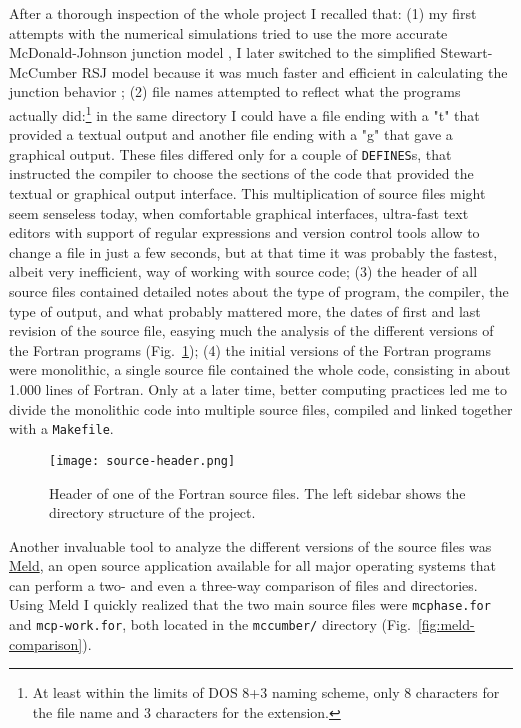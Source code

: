 After a thorough inspection of the whole project I recalled that:
(1) my first attempts with the numerical simulations tried to use the more accurate McDonald-Johnson junction model \cite{McDonald:1976}, I later switched to the simplified Stewart-McCumber RSJ model because it was much faster and efficient in calculating the junction behavior \cite{McCumber:1968, Stewart:1974};
(2) file names attempted to reflect what the programs actually did:\footnote{At least within the limits of DOS 8+3 naming scheme, only 8 characters for the file name and 3 characters for the extension.} 
in the same directory I could have a file ending with a "t" that provided a textual output and another file ending with a "g" that gave a graphical output.
These files differed only for a couple of \texttt{DEFINES}s, that instructed the compiler to choose the sections of the code that provided the textual or graphical output interface.
This multiplication of source files might seem senseless today, when comfortable graphical interfaces, ultra-fast text editors with support of regular expressions and version control tools allow to change a file in just a few seconds, but at that time it was probably the fastest, albeit very inefficient, way of working with source code;
(3) the header of all source files contained detailed notes about the type of program, the compiler, the type of output, and what probably mattered more, the dates of first and last revision of the source file, easying much the analysis of the different versions of the Fortran programs (Fig.~\ref{fig:source-header}); 
(4) the initial versions of the Fortran programs were monolithic, a single source file contained the whole code, consisting in about 1.000 lines of Fortran. Only at a later time, better computing practices led me to divide the monolithic code into multiple source files, compiled and linked together with a \texttt{Makefile}.

\begin{figure}[tb]
	\centering
	\texttt{[image: source-header.png]}
	\caption{Header of one of the Fortran source files. The left sidebar shows the directory structure of the project.}
	\label{fig:source-header}
\end{figure}


Another invaluable tool to analyze the different versions of the source files was \href{http://meldmerge.org/}{Meld}, an open source application available for all major operating systems that can perform a two- and even a three-way comparison of files and directories.
Using Meld I quickly realized that the two main source files were \texttt{mcphase.for} and \texttt{mcp-work.for}, both located in the \texttt{mccumber/} directory  (Fig.~\ref{fig:meld-comparison}).

